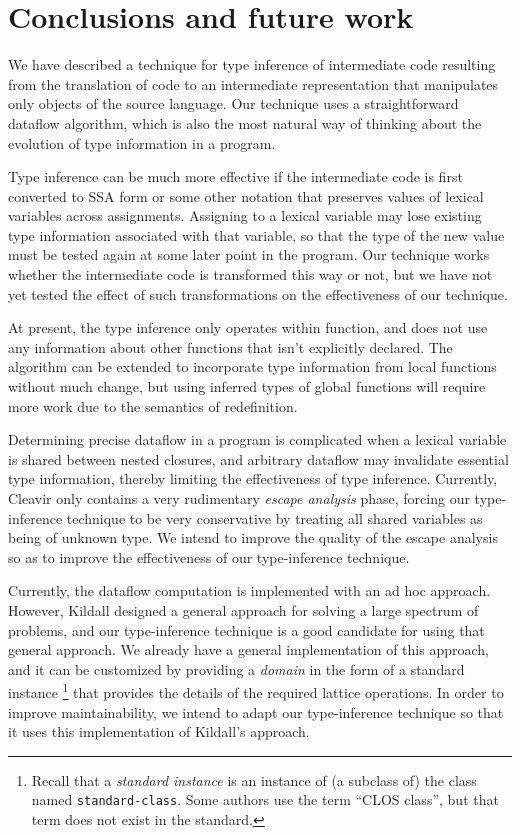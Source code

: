 \section{Conclusions and future work}

We have described a technique for type inference of intermediate code
resulting from the translation of \commonlisp{} code to an
intermediate representation that manipulates only objects of the
source language.  Our technique uses a straightforward dataflow
algorithm, which is also the most natural way of thinking about the
evolution of type information in a \commonlisp{} program.

Type inference can be much more effective if the intermediate code is
first converted to SSA form \cite{Cytron:1989:EMC:75277.75280,
  Cytron:1991:ECS:115372.115320} or some other notation that preserves
values of lexical variables across assignments.  Assigning to a
lexical variable may lose existing type information associated with
that variable, so that the type of the new value must be tested again
at some later point in the program.  Our technique works whether the
intermediate code is transformed this way or not, but we have not yet
tested the effect of such transformations on the effectiveness of our
technique.

At present, the type inference only operates within function, and does
not use any information about other functions that isn't explicitly
declared. The algorithm can be extended to incorporate type information
from local functions without much change, but using inferred types of
global functions will require more work due to the semantics of
redefinition.

Determining precise dataflow in a \commonlisp{} program is complicated
when a lexical variable is shared between nested closures, and
arbitrary dataflow may invalidate essential type information, thereby
limiting the effectiveness of type inference.  Currently, Cleavir only
contains a very rudimentary \emph{escape analysis} phase, forcing our
type-inference technique to be very conservative by treating all shared
variables as being of unknown type.  We intend to improve the quality
of the escape analysis so as to improve the effectiveness of our
type-inference technique.

Currently, the dataflow computation is implemented with an ad hoc
approach.  However, Kildall \cite{Kildall:1973:UAG:512927.512945}
designed a general approach for solving a large spectrum of problems,
and our type-inference technique is a good candidate for using that
general approach.  We already have a general implementation of this
approach, and it can be customized by providing a \emph{domain} in the
form of a standard instance%
\footnote{Recall that a \emph{standard instance} is an instance of
  (a subclass of) the class named \texttt{standard-class}.  Some
  authors use the term ``CLOS class'', but that term does not exist in
  the \commonlisp{} standard.}
that provides the details of the required lattice operations.  In
order to improve maintainability, we intend to adapt our
type-inference technique so that it uses this implementation of
Kildall's approach.

